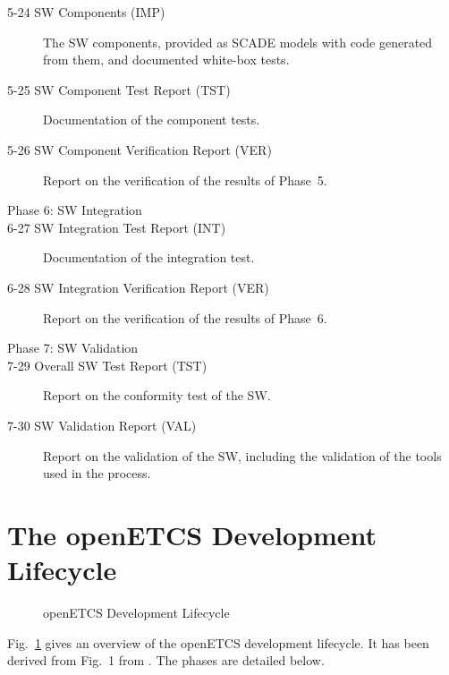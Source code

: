\documentclass{template/openetcs_article}
\begin{document}
\begin{description}
\item[5-24 SW Components (IMP)] The SW components, provided as SCADE models
  with code generated from them, and documented white-box tests.
\item[5-25 SW Component Test Report (TST)] Documentation of the component tests. 
\item[5-26 SW Component Verification Report (VER)] Report on the
  verification of the results of Phase~5.
\item[Phase 6: SW Integration] 
\item[6-27 SW Integration Test Report (INT)] Documentation of the
  integration test. 
\item[6-28 SW Integration Verification Report (VER)] Report on the
  verification of the results of Phase~6.
\item[Phase 7: SW Validation] 
\item[7-29 Overall SW Test Report (TST)] Report on the conformity test of
  the SW.
\item[7-30 SW Validation Report (VAL)] Report on the validation of the
  SW, including the validation of the tools used in the process.
\end{description}




\section{The openETCS Development Lifecycle}
\label{sec:devel-lifecycle}



\begin{figure}[hbt]
  \centering
  \def\svgwidth{.9\textwidth}
  {\tiny
  }
  \caption{openETCS Development Lifecycle}
  \label{fig:lifecycle2}
\end{figure}

Fig.~\ref{fig:lifecycle2} gives an overview of the openETCS
development lifecycle. It has been derived from Fig.~1 from
\cite{EN50128:2011}. The phases are detailed below.
\end{document}
